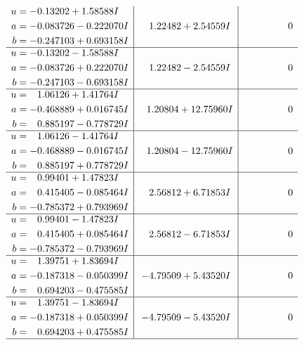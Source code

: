 \documentclass[1p]{elsarticle_modified}
\theoremstyle{definition}
\begin{document}
$$\begin{array}{c|c|c}
\begin{aligned}
u &= -0.13202 + 1.58588 I \\
a &= -0.083726 - 0.222070 I \\
b &= -0.247103 + 0.693158 I\end{aligned}
 & \phantom{-}1.22482 + 2.54559 I & \phantom{-0.000000 } 0 \\ \hline\begin{aligned}
u &= -0.13202 - 1.58588 I \\
a &= -0.083726 + 0.222070 I \\
b &= -0.247103 - 0.693158 I\end{aligned}
 & \phantom{-}1.22482 - 2.54559 I & \phantom{-0.000000 } 0 \\ \hline\begin{aligned}
u &= \phantom{-}1.06126 + 1.41764 I \\
a &= -0.468889 + 0.016745 I \\
b &= \phantom{-}0.885197 - 0.778729 I\end{aligned}
 & \phantom{-}1.20804 + 12.75960 I & \phantom{-0.000000 } 0 \\ \hline\begin{aligned}
u &= \phantom{-}1.06126 - 1.41764 I \\
a &= -0.468889 - 0.016745 I \\
b &= \phantom{-}0.885197 + 0.778729 I\end{aligned}
 & \phantom{-}1.20804 - 12.75960 I & \phantom{-0.000000 } 0 \\ \hline\begin{aligned}
u &= \phantom{-}0.99401 + 1.47823 I \\
a &= \phantom{-}0.415405 - 0.085464 I \\
b &= -0.785372 + 0.793969 I\end{aligned}
 & \phantom{-}2.56812 + 6.71853 I & \phantom{-0.000000 } 0 \\ \hline\begin{aligned}
u &= \phantom{-}0.99401 - 1.47823 I \\
a &= \phantom{-}0.415405 + 0.085464 I \\
b &= -0.785372 - 0.793969 I\end{aligned}
 & \phantom{-}2.56812 - 6.71853 I & \phantom{-0.000000 } 0 \\ \hline\begin{aligned}
u &= \phantom{-}1.39751 + 1.83694 I \\
a &= -0.187318 - 0.050399 I \\
b &= \phantom{-}0.694203 - 0.475585 I\end{aligned}
 & -4.79509 + 5.43520 I & \phantom{-0.000000 } 0 \\ \hline\begin{aligned}
u &= \phantom{-}1.39751 - 1.83694 I \\
a &= -0.187318 + 0.050399 I \\
b &= \phantom{-}0.694203 + 0.475585 I\end{aligned}
 & -4.79509 - 5.43520 I & \phantom{-0.000000 } 0\\
 \hline 
 \end{array}$$\newpage\newpage\renewcommand{\arraystretch}{1}
\end{document}

